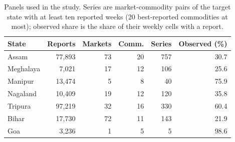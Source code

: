 \begin{table}[t]
\caption{Panels used in the study. Series are market-commodity pairs of the target state with at least ten reported weeks (20 best-reported commodities at most); observed share is the share of their weekly cells with a report.}
\label{tab:datastats}
\small
\begin{tabular}{lrrrrr}
\toprule
State & Reports & Markets & Comm. & Series & Observed (\%) \\
\midrule
Assam & 77{,}893 & 73 & 20 & 757 & 30.7 \\
Meghalaya & 7{,}021 & 17 & 12 & 106 & 25.6 \\
Manipur & 13{,}474 & 5 & 8 & 40 & 75.9 \\
Nagaland & 10{,}409 & 19 & 12 & 120 & 35.8 \\
Tripura & 97{,}219 & 32 & 16 & 330 & 60.4 \\
Bihar & 17{,}730 & 72 & 11 & 143 & 21.9 \\
Goa & 3{,}236 & 1 & 5 & 5 & 98.6 \\
\bottomrule
\end{tabular}
\end{table}
